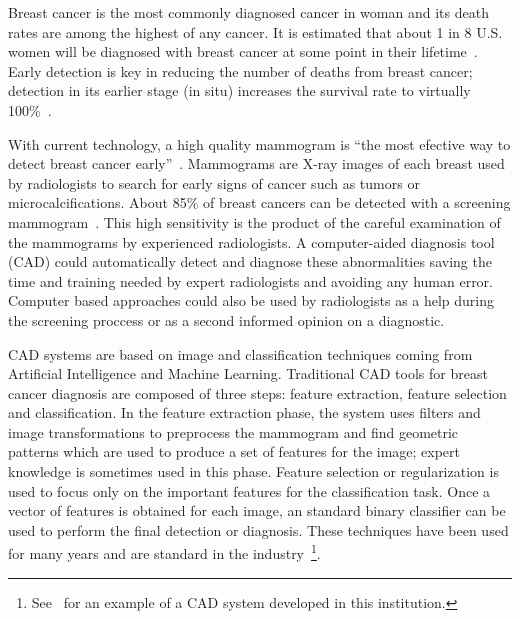 Breast cancer is the most commonly diagnosed cancer in woman and its death rates are among the highest of any cancer. It is estimated that about 1 in 8 U.S. women will be diagnosed with breast cancer at some point in their lifetime~\cite{Howlader2014}. Early detection is key in reducing the number of deaths from breast cancer; detection in its earlier stage (in situ) increases the survival rate to virtually 100\%~\cite{Howlader2014}.

With current technology, a high quality mammogram is ``the most efective way to detect breast cancer early''~\cite{Mammograms2014}. Mammograms are X-ray images of each breast used by radiologists to search for early signs of cancer such as tumors or microcalcifications. About 85\% of breast cancers can be detected with a screening mammogram~\cite{PerformanceMammography2013}. This high sensitivity is the product of the careful examination of the mammograms by experienced radiologists. A computer-aided diagnosis tool (CAD) could automatically detect and diagnose these abnormalities saving the time and training needed by expert radiologists and avoiding any human error. Computer based approaches could also be used by radiologists as a help during the screening proccess or as a second informed opinion on a diagnostic.

CAD systems are based on image and classification techniques coming from Artificial Intelligence and Machine Learning. Traditional CAD tools for breast cancer diagnosis are composed of three steps: feature extraction, feature selection and classification. In the feature extraction phase, the system uses filters and image transformations to preprocess the mammogram and find geometric patterns which are used to produce a set of features for the image; expert knowledge is sometimes used in this phase. Feature selection or regularization is used to focus only on the important features for the classification task. Once a vector of features is obtained for each image, an standard binary classifier can be used to perform the final detection or diagnosis. These techniques have been used for many years and are standard in the industry~\footnote{See~\cite{Hernandez2014} for an example of a CAD system developed in this institution.}.

